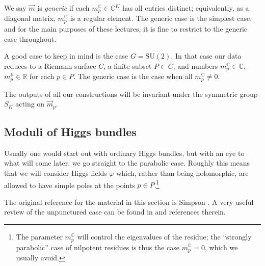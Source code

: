 \documentclass[12pt,letterpaper,reqno]{article}
\numberwithin{equation}{section}
\newcommand{\R}{\ensuremath{\mathbb R}}
\newcommand{\C}{\ensuremath{\mathbb C}}
\newcommand{\ti}[1]{\textit{#1}}
\newcommand{\SU}{\mathrm{SU}}
\newcommand{\fixme}[1]{{\color{orange}{[#1]}}}
\begin{document}
\begin{defn}
We say $\vec{m}$ is \ti{generic} if each $m^\C_p \in \C^K$
has all entries distinct; equivalently, as a diagonal
matrix, $m^\C_p$ is a regular element.
The generic case is the simplest
case, and for the main purposes of these lectures,
it is fine to restrict to the generic case throughout.
\end{defn}

\begin{example}[The case of $G = \SU(2)$]
A good case to keep in mind is the case $G = \SU(2)$. In that case our data reduces to a Riemann surface $C$, a finite subset $P \subset C$,
and numbers $m^\C_p \in \C$, $m^\R_p \in \R$ for each $p \in P$. The generic case is the case when all $m^\C_p \neq 0$.
\end{example}

\begin{remark} The outputs of all our constructions will 
be invariant under the symmetric group $S_K$ acting on $\vec m_p$.
\end{remark}


\subsection{Moduli of Higgs bundles}

Usually one would start out with ordinary Higgs bundles,
but with an eye to what will come later, we go straight
to the parabolic case. Roughly this means that we will consider
Higgs fields $\varphi$ which, rather than being holomorphic, are
allowed to have simple poles at the points $p \in P$.\footnote{The parameter $m_p^\C$ will
control the eigenvalues of the residue; the
``strongly parabolic'' case of nilpotent residues
is thus the case $m_p^\C = 0$, which we usually
avoid.}

The original reference for the material in this section
is Simpson \cite{hbnc}.
A very useful review of the unpunctured case can be found in
\cite{Wentworth2014} and references therein.
\end{document}
